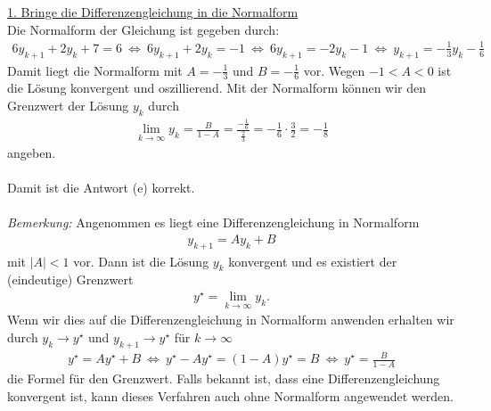 \underline{1. Bringe die Differenzengleichung in die Normalform}\\
Die Normalform der Gleichung ist gegeben durch:
\begin{align*}
	6y_{k+1} + 2 y_k +7 = 6
	\ \Leftrightarrow \
	6y_{k+1} + 2 y_k  = -1
	\ \Leftrightarrow \
	6y_{k+1} = - 2 y_k   -1
	\ \Leftrightarrow \
	y_{k+1} = - \frac{1}{3} y_k   - \frac{1}{6}
\end{align*}
Damit liegt die Normalform mit $A = -\frac{1}{3}$ und $B = - \frac{1}{6}$ vor. Wegen $-1 < A  < 0 $ ist die Lösung konvergent und oszillierend. Mit der Normalform können wir den Grenzwert der Lösung $y_k$ durch 
\begin{align*}
	\lim \limits_{k \to \infty} y_k = \frac{B}{1 -A} = \frac{-\frac{1}{6}}{\frac{2}{3}}
	=
	- \frac{1}{6} \cdot \frac{3}{2} = -\frac{1}{8}
\end{align*}
angeben.\\
\\
Damit ist die Antwort (e) korrekt.\\
\\
\textit{Bemerkung:} Angenommen es liegt eine Differenzengleichung
in Normalform 
\begin{align*}
	y_{k+1} = A y_k + B
\end{align*}
mit $|A|<1$ vor. Dann ist die Lösung $y_k$ konvergent und es existiert der (eindeutige) Grenzwert
\begin{align*}
	y^\star = \lim \limits_{k \to \infty} y_k.
\end{align*}
Wenn wir dies auf die Differenzengleichung in Normalform anwenden erhalten wir durch $y_k \to y^\star$ und $y_{k+1} \to y^\star$ für $k \to \infty$
\begin{align*}
	y^\star = A y^\star + B
	\ \Leftrightarrow \
	y^\star - A y^\star = (1 -A) y^\star = B
	\ \Leftrightarrow \
	y^\star = \frac{B}{1-A}
\end{align*}
die Formel für den Grenzwert. Falls bekannt ist, dass eine Differenzengleichung konvergent ist, kann dieses Verfahren auch ohne Normalform angewendet werden.